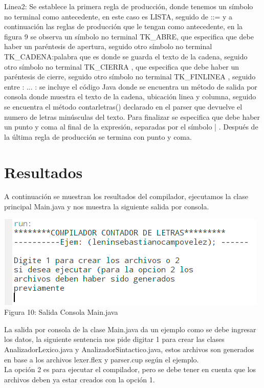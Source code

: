 \documentclass[a4paper,openright,12pt]{article}
\begin{document}
Linea2: Se establece la primera regla de producción, donde tenemos un símbolo no terminal como antecedente, en este caso es LISTA, seguido de ::= y a continuación las reglas de producción que le tengan como antecedente, en la figura 9 se observa un símbolo no terminal TK\_ABRE, que especifica que debe haber un paréntesis de apertura, seguido otro símbolo no terminal TK\_CADENA:palabra que es donde se guarda el texto de la cadena, seguido otro símbolo no terminal TK\_CIERRA , que especifica que debe haber un paréntesis de cierre, seguido otro símbolo no terminal TK\_FINLINEA , seguido entre {: ... :} se incluye el código Java donde se encuentra un método de salida por consola donde muestra el texto de la cadena, ubicación linea y columna, seguido se encuentra el método contarletras() declarado en el parser que devuelve el numero de letras minúsculas del texto. Para finalizar se especifica que debe haber un punto y coma al final de la expresión, separadas por el símbolo | . Después de la última regla de producción se termina con punto y coma.

\section{Resultados}
A continuación se muestran los resultados del compilador, ejecutamos la clase principal
Main.java y nos muestra la siguiente salida por consola.


\begin{center}
\includegraphics[height=0.2\textheight]{resultados.png}
\\
Figura 10: Salida Consola Main.java
\end{center}

La salida por consola de la clase Main.java da un ejemplo como se debe ingresar los datos, la siguiente sentencia nos pide digitar 1 para crear las clases AnalizadorLexico.java y AnalizadorSintactico.java, estos archivos son generados en base a los archivos lexer.flex
y parser.cup según el ejemplo.\\
La opción 2 es para ejecutar el compilador, pero se debe tener en cuenta que los archivos deben ya estar creados con la opción 1.
\end{document}
